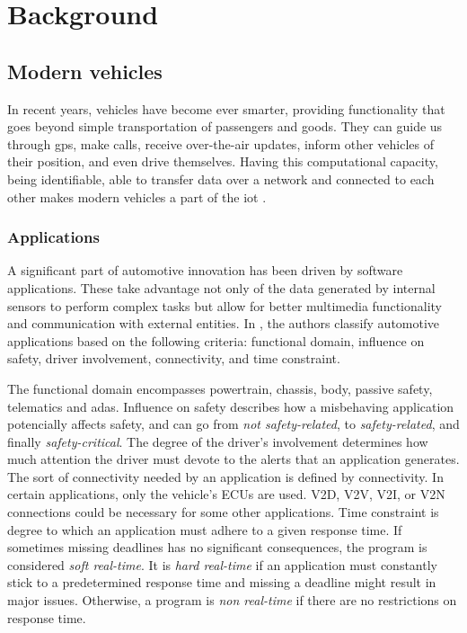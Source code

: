 \chapter{Background}
\label{c:background}

\section{Modern vehicles}

In recent years, vehicles have become ever smarter, providing functionality that goes beyond simple transportation of passengers and goods. They can guide us through \gls{gps}, make calls, receive over-the-air updates, inform other vehicles of their position, and even drive themselves. Having this computational capacity, being identifiable, able to transfer data over a network and connected to each other makes modern vehicles a part of the \acrlong{iot} \citep{Lombardi2021}.\par

\subsection{Applications}

A significant part of automotive innovation has been driven by software applications. These take advantage not only of the data generated by internal sensors to perform complex tasks but allow for better multimedia functionality and communication with external entities. In \cite{Le2018}, the authors classify automotive applications based on the following criteria: functional domain, influence on safety, driver involvement, connectivity, and time constraint.\par

The functional domain encompasses powertrain, chassis, body, passive safety, telematics and \gls{adas}. Influence on safety describes how a misbehaving application potencially affects safety, and can go from \emph{not safety-related}, to \emph{safety-related}, and finally \emph{safety-critical}. The degree of the driver's involvement determines how much attention the driver must devote to the alerts that an application generates. The sort of connectivity needed by an application is defined by connectivity. In certain applications, only the vehicle's ECUs are used. V2D, V2V, V2I, or V2N connections could be necessary for some other applications. Time constraint is degree to which an application must adhere to a given response time. If sometimes missing deadlines has no significant consequences, the program is considered \emph{soft real-time}. It is \emph{hard real-time} if an application must constantly stick to a predetermined response time and missing a deadline might result in major issues. Otherwise, a program is \emph{non real-time} if there are no restrictions on response time.\par

